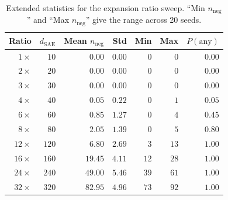 \documentclass[11pt,a4paper]{article}
\newcommand{\nneg}{n_{\mathrm{neg}}}
\begin{document}
\begin{table}[H]
\centering
\caption{Extended statistics for the expansion ratio sweep.
``Min $\nneg$'' and ``Max $\nneg$'' give the range across 20 seeds.}
\label{tab:expansion_ext}
\begin{tabular}{@{}rrrrrrr@{}}
\toprule
Ratio & $d_\text{SAE}$ & Mean $\nneg$ & Std & Min & Max & $P(\mathrm{any})$ \\
\midrule
$1\times$  & $ 10$ & $0.00$ & $0.00$ & $0$ & $0$  & $0.00$ \\
$2\times$  & $ 20$ & $0.00$ & $0.00$ & $0$ & $0$  & $0.00$ \\
$3\times$  & $ 30$ & $0.00$ & $0.00$ & $0$ & $0$  & $0.00$ \\
$4\times$  & $ 40$ & $0.05$ & $0.22$ & $0$ & $1$  & $0.05$ \\
$6\times$  & $ 60$ & $0.85$ & $1.27$ & $0$ & $4$  & $0.45$ \\
$8\times$  & $ 80$ & $2.05$ & $1.39$ & $0$ & $5$  & $0.80$ \\
$12\times$ & $120$ & $6.80$ & $2.69$ & $3$ & $13$ & $1.00$ \\
$16\times$ & $160$ & $19.45$ & $4.11$ & $12$ & $28$ & $1.00$ \\
$24\times$ & $240$ & $49.00$ & $5.46$ & $39$ & $61$ & $1.00$ \\
$32\times$ & $320$ & $82.95$ & $4.96$ & $73$ & $92$ & $1.00$ \\
\bottomrule
\end{tabular}
\end{table}
\end{document}
